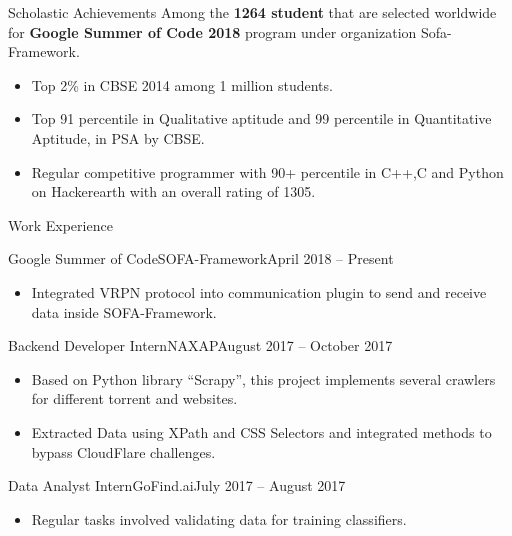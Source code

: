 \documentclass[]{mcdowellcv}
\begin{document}
	\begin{cvsection}{Scholastic Achievements}{}{}
	Among the \textbf{1264 student} that are selected worldwide for \textbf{Google Summer of Code 2018} program under organization Sofa-Framework.
			\begin{itemize}
				\item Top 2\% in CBSE 2014 among 1 million students.
				\item Top 91 percentile in Qualitative aptitude and 99 percentile in Quantitative Aptitude, in PSA by CBSE.
                \item Regular competitive programmer with 90+ percentile in C++,C and Python on Hackerearth with an overall rating of 1305.
			\end{itemize}
		
	\end{cvsection}
	\begin{cvsection}{Work Experience}
	    \begin{cvsubsection}{Google Summer of Code}{SOFA-Framework}{April 2018 -- Present}
			\begin{itemize}
				\item Integrated VRPN protocol into communication plugin to send and receive data inside SOFA-Framework.
	   			\end{itemize}
		\end{cvsubsection}
		
		\begin{cvsubsection}{Backend Developer Intern}{NAXAP}{August 2017 -- October 2017}
			\begin{itemize}
				\item Based on Python library “Scrapy”, this project implements several crawlers for different torrent and websites.
	   			\item Extracted Data using XPath and CSS Selectors and integrated methods to bypass CloudFlare challenges.
	   			\end{itemize}
		\end{cvsubsection}
		
		\begin{cvsubsection}{Data Analyst Intern}{GoFind.ai}{July 2017 -- August 2017}
			\begin{itemize}
				\item Regular tasks involved validating data for training classifiers.
				\end{itemize}
		\end{cvsubsection}
	\end{cvsection}
	
\end{document}
